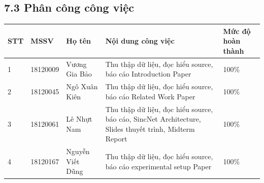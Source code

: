 \documentclass{article}
\newcommand\T{\rule{0pt}{2.6ex}}       %
\newcommand\B{\rule[-1.2ex]{0pt}{0pt}} %
\begin{document}
	\subsection{7.3 Phân công công việc}
	\begin{table}[H]
		\begin{tabular}{ | l | l | l | p{5.5cm} | p{3cm} |}
			\hline
			STT & MSSV & Họ tên & Nội dung công việc & Mức độ hoàn thành  \\ \hline
			1 & 18120009 & Vương Gia Bảo & Thu thập dữ liệu, đọc hiểu source, báo cáo Introduction Paper &  100\%\T\B\\ \hline
			2 & 18120045 & Ngô Xuân Kiên & Thu thập dữ liệu, đọc hiểu source, báo cáo Related Work Paper & 100\%\T\B \\ \hline
			3 & 18120061 & Lê Nhựt Nam & Thu thập dữ liệu, đọc hiểu source, báo cáo, SincNet Architecture, Slides thuyết trình, Midterm Report & 100\%\T\B \\ \hline
			4 & 18120167 & Nguyễn Viết Dũng &  Thu thập dữ liệu, đọc hiểu source, báo cáo experimental setup Paper & 100\%\T\B \\ \hline
		\end{tabular}
	\end{table}
	\nocite{*}
	\newpage\cleardoublepage
	
	
\end{document}
